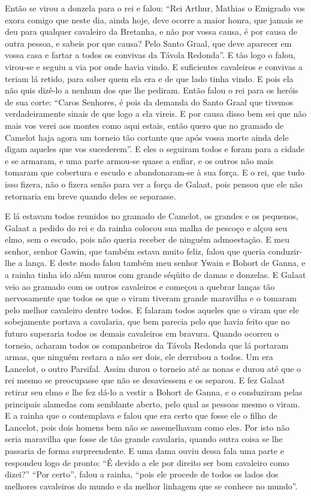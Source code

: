 Então se virou a donzela para o rei e falou: “Rei Arthur, Mathias o Emigrado vos
exora comigo que neste dia, ainda hoje, deve ocorre a maior honra, que jamais
se deu para qualquer cavaleiro da Bretanha, e não por vossa causa, é por causa
de outra pessoa, e sabeis por que causa? Pelo Santo Graal, que deve aparecer em
vossa casa e fartar a todos os convivas da Távola Redonda”. E
tão logo o falou, virou-se e seguiu a via por onde havia vindo. E suficientes
cavaleiros e convivas a teriam lá retido, para saber quem ela era e de que lado
tinha vindo. E pois ela não quis dizê-lo a nenhum dos que lhe pediram. Então
falou o rei para os heróis de sua corte: “Caros Senhores, é pois da demanda do
Santo Graal que tivemos verdadeiramente sinais de que logo a ela vireis. E por
causa disso bem sei que não mais vos verei aos montes como aqui estais, então
quero que no gramado de Camelot haja agora um torneio tão cortante que após
vossa morte ainda dele digam aqueles que vos sucederem”. E eles o seguiram
todos e foram para a cidade e se armaram, e uma parte armou-se quase a enfiar,
e os outros não mais tomaram que cobertura e escudo e abandonaram-se à sua
força. E o rei, que tudo isso fizera, não o fizera senão para ver a força de
Galaat, pois pensou que ele não retornaria em breve quando deles se separasse. 

E lá estavam todos reunidos no gramado de Camelot, os grandes e os pequenos,
Galaat a pedido do rei e da rainha colocou sua malha de pescoço e alçou seu
elmo, sem o escudo, pois não queria receber de ninguém admoestação. E meu
senhor, senhor Gawin, que também estava muito feliz, falou que queria
conduzir-lhe a lança. E deste modo falou também meu senhor Ywain e Bohort de
Ganna, e a rainha tinha ido além muros com grande séqüito de damas e donzelas. 
E Galaat veio ao gramado com os outros cavaleiros e começou a quebrar
lanças tão nervosamente que todos os que o viram tiveram grande maravilha e o
tomaram pelo melhor cavaleiro dentre todos. E falaram todos aqueles que o viram
que ele sobejamente portava a cavalaria, que bem parecia pelo que havia feito
que no futuro superaria todos os demais cavaleiros em bravura. Quando ocorreu o
torneio, acharam todos os companheiros da Távola Redonda que lá portaram armas,
que ninguém restara a não ser dois, ele derrubou a todos. Um era Lancelot, o
outro Parsifal. Assim durou o torneio até as nonas e durou até que o rei mesmo
se preocupasse que não se desaviessem e os separou. E fez Galaat retirar seu
elmo e lhe fez dá-lo a vestir a Bohort de Ganna, e o conduziram pelas
principais alamedas com semblante aberto, pelo qual as pessoas mesmo o viram. E
a rainha que o contemplava e falou que era certo que fosse ele o filho de
Lancelot, pois dois homens bem não se assemelhavam como eles. Por isto não
seria maravilha que fosse de tão grande cavalaria, quando outra coisa se lhe
passaria de forma surpreendente. E uma dama ouviu dessa fala uma parte e
respondeu logo de pronto: “É devido a ele por direito ser bom cavaleiro como
dizei?” “Por certo”, falou a rainha, “pois ele procede de todos os lados dos
melhores cavaleiros do mundo e da melhor linhagem que se conhece no mundo”. 

